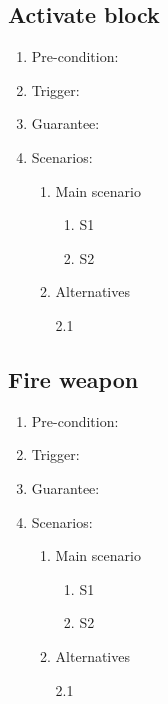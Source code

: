 \documentclass[a4paper,twoside,11pt]{article}
\begin{document}
\subsection*{Activate block}
\begin{enumerate}
\item Pre-condition: 
\item Trigger:
\item Guarantee:
\item Scenarios: 
	\begin{enumerate}
	\item Main scenario
		\begin{enumerate}[1)]
		\item S1
		\item S2
		\end{enumerate}
	\item Alternatives
		\begin{description}
		\item[2.1]
		\end{description}
	\end{enumerate}
\end{enumerate}
\subsection*{Fire weapon}
\begin{enumerate}
\item Pre-condition: 
\item Trigger:
\item Guarantee:
\item Scenarios: 
	\begin{enumerate}
	\item Main scenario
		\begin{enumerate}[1)]
		\item S1
		\item S2
		\end{enumerate}
	\item Alternatives
		\begin{description}
		\item[2.1]
		\end{description}
	\end{enumerate}
\end{enumerate}
\end{document}
